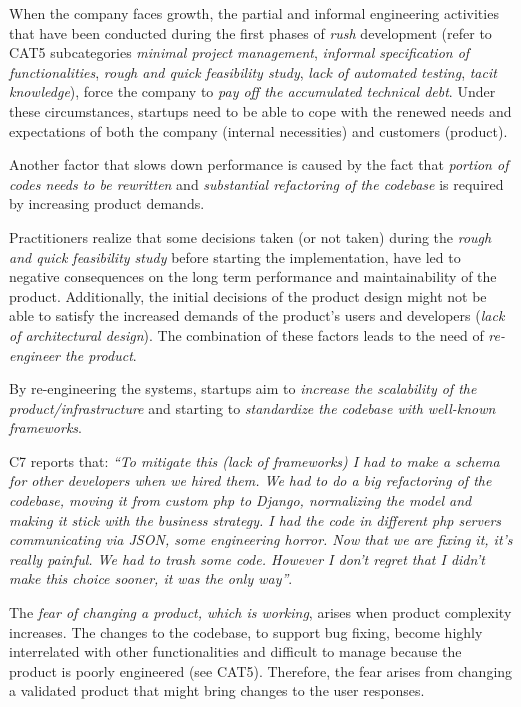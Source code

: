 \documentclass[10pt,journal,letterpaper,compsoc]{IEEEtran}
\begin{document}
When the company faces growth, the partial and informal engineering activities
that have been conducted during the first phases of \textit{rush} development
(refer to CAT5 subcategories \textit{minimal project management},
\textit{informal specification of functionalities}, \textit{rough and quick
feasibility study}, \textit{lack of automated testing}, \textit{tacit
knowledge}), force the company to \textit{pay off the accumulated technical
debt}. Under these circumstances, startups need to be able to cope with the
renewed needs and expectations of both the company (internal necessities) and
customers (product).

Another factor that slows down performance is caused by the fact that
\textit{portion of codes needs to be rewritten} and \textit{substantial
refactoring of the codebase} is required by increasing product demands.

Practitioners realize that some decisions taken (or not taken) during the
\textit{rough and quick feasibility study} before starting the implementation,
have led to negative consequences on the long term performance and
maintainability of the product. Additionally, the initial decisions of the
product design might not be able to satisfy the increased demands of the
product's users and developers (\textit{lack of architectural design}). The
combination of these factors leads to the need of \textit{re-engineer the
product}.

By re-engineering the systems, startups aim to \textit{increase the scalability
of the product/infrastructure} and starting to \textit{standardize the codebase
with well-known frameworks}.

C7 reports that: \textit{``To mitigate this (lack of frameworks) I had to make
a schema for other developers when we hired them. We had to do a big
refactoring of the codebase, moving it from custom php to Django, normalizing
the model and making it stick with the business strategy. I had the code in
different php servers communicating via JSON, some engineering horror. Now that
we are fixing it, it's really painful. We had to trash some code. However I
don't regret that I didn't make this choice sooner, it was the only way''}.

The \textit{fear of changing a product, which is working}, arises when product
complexity increases. The changes to the codebase, to support bug fixing, become
highly interrelated with other functionalities and difficult to manage because
the product is poorly engineered (see CAT5). Therefore, the fear arises from
changing a validated product that might bring changes to the user responses.
\end{document}
